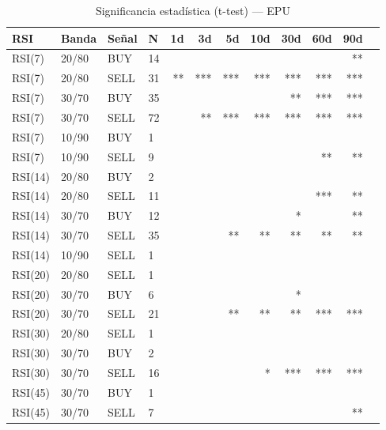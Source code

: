 %
\begin{table}[htbp]
    \centering
    \caption{Significancia estadística (t-test) --- EPU}
    \label{tab:sig_epu}
    \small
    \begin{tabular}{llllrrrrrrrr}
        \toprule
        \textbf{RSI} & \textbf{Banda} & \textbf{Se\~{n}al} & \textbf{N} & \textbf{1d} & \textbf{3d} & \textbf{5d} & \textbf{10d} & \textbf{30d} & \textbf{60d} & \textbf{90d} \\
        \midrule
        RSI(7) & 20/80 & BUY & 14 &  &  &  &  &  &  & ** \\
        RSI(7) & 20/80 & SELL & 31 & ** & *** & *** & *** & *** & *** & *** \\
        RSI(7) & 30/70 & BUY & 35 &  &  &  &  & ** & *** & *** \\
        RSI(7) & 30/70 & SELL & 72 &  & ** & *** & *** & *** & *** & *** \\
        RSI(7) & 10/90 & BUY & 1 &  &  &  &  &  &  &  \\
        RSI(7) & 10/90 & SELL & 9 &  &  &  &  &  & ** & ** \\
        \midrule
        RSI(14) & 20/80 & BUY & 2 &  &  &  &  &  &  &  \\
        RSI(14) & 20/80 & SELL & 11 &  &  &  &  &  & *** & ** \\
        RSI(14) & 30/70 & BUY & 12 &  &  &  &  & * &  & ** \\
        RSI(14) & 30/70 & SELL & 35 &  &  & ** & ** & ** & ** & ** \\
        RSI(14) & 10/90 & SELL & 1 &  &  &  &  &  &  &  \\
        \midrule
        RSI(20) & 20/80 & SELL & 1 &  &  &  &  &  &  &  \\
        RSI(20) & 30/70 & BUY & 6 &  &  &  &  & * &  &  \\
        RSI(20) & 30/70 & SELL & 21 &  &  & ** & ** & ** & *** & *** \\
        \midrule
        RSI(30) & 20/80 & SELL & 1 &  &  &  &  &  &  &  \\
        RSI(30) & 30/70 & BUY & 2 &  &  &  &  &  &  &  \\
        RSI(30) & 30/70 & SELL & 16 &  &  &  & * & *** & *** & *** \\
        \midrule
        RSI(45) & 30/70 & BUY & 1 &  &  &  &  &  &  &  \\
        RSI(45) & 30/70 & SELL & 7 &  &  &  &  &  &  & ** \\
        \bottomrule
    \end{tabular}
\end{table}
